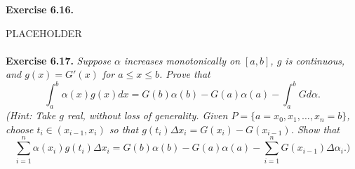 \documentclass{article}
\begin{document}
\textbf{Exercise 6.16.}

PLACEHOLDER \\\\






\textbf{Exercise 6.17.}
\emph{Suppose $\alpha$ increases monotonically on $[a,b]$,
$g$ is continuous,
and $g(x) = G'(x)$ for $a \leq x \leq b$.
Prove that
\[
  \int_{a}^{b} \alpha(x)g(x)dx
  = G(b)\alpha(b) - G(a)\alpha(a) - \int_{a}^{b}G d\alpha.
\]
(Hint: Take $g$ real, without loss of generality.
Given $P = \{a = x_0, x_1, \ldots, x_n = b\}$,
choose $t_i \in (x_{i-1},x_i)$ so that $g(t_i)\Delta x_i = G(x_i) - G(x_{i-1})$.
Show that
\[
  \sum_{i=1}^{n} \alpha(x_i)g(t_i)\Delta x_i
  = G(b)\alpha(b) - G(a)\alpha(a) - \sum_{i=1}^{n} G(x_{i-1})\Delta \alpha_i.)
\]} \\
\end{document}
